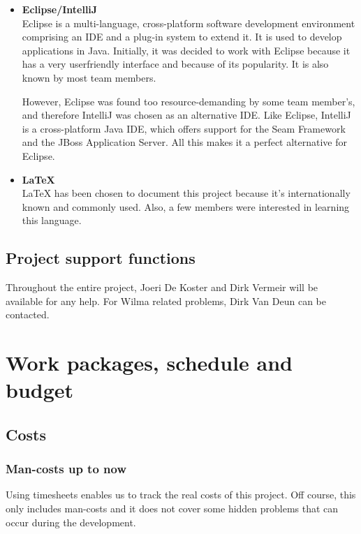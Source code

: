 \documentclass[salesmen, twoside]{../../../templates/latex/2009/softproj}
\begin{document}
\begin{projdoc}
\begin{itemize}
				\item \textbf{Eclipse/IntelliJ} \\
				Eclipse is a multi-language, cross-platform software development environment comprising an IDE 
				and a plug-in system to extend it. It is used to develop applications in 
				Java. Initially, it was decided to work with Eclipse because 
				it has a very userfriendly interface and because of its popularity. It is also
				known by most team members. 
				
				However, Eclipse was found too resource-demanding by some team member's, and therefore 
				IntelliJ was chosen as an alternative IDE.
				Like Eclipse, IntelliJ is a cross-platform Java IDE, which offers support for
				the Seam Framework and the JBoss Application Server. All this makes it a 
				perfect alternative for Eclipse.
				
				\item \textbf{\LaTeX} \\
				 \LaTeX{} has been chosen to document this project because it's 
				internationally known and commonly used. Also, a few members 
				were interested in learning this language.
				
			\end{itemize}	
			
			\section{Project support functions}
			
			Throughout the entire project, Joeri De Koster and Dirk Vermeir will 
			be available for any help. For Wilma related problems, Dirk Van Deun 
			can be contacted.
			
	
	\chapter{Work packages, schedule and budget}
			
			\section{Costs}
			
			\subsection{Man-costs up to now}
			
			Using timesheets enables us to track the real costs of this project. Off course,
			this only includes man-costs and it does not cover some hidden problems that can occur during
			the development.
			

\end{projdoc}
\end{document}
